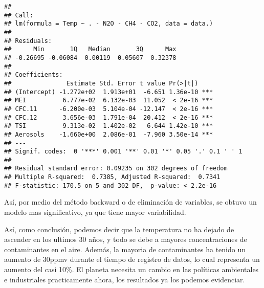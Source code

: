 \documentclass[]{article}
\begin{document}
\begin{verbatim}
## 
## Call:
## lm(formula = Temp ~ . - N2O - CH4 - CO2, data = data.)
## 
## Residuals:
##      Min       1Q   Median       3Q      Max 
## -0.26695 -0.06084  0.00119  0.05607  0.32378 
## 
## Coefficients:
##               Estimate Std. Error t value Pr(>|t|)    
## (Intercept) -1.272e+02  1.913e+01  -6.651 1.36e-10 ***
## MEI          6.777e-02  6.132e-03  11.052  < 2e-16 ***
## CFC.11      -6.200e-03  5.104e-04 -12.147  < 2e-16 ***
## CFC.12       3.656e-03  1.791e-04  20.412  < 2e-16 ***
## TSI          9.313e-02  1.402e-02   6.644 1.42e-10 ***
## Aerosols    -1.660e+00  2.086e-01  -7.960 3.50e-14 ***
## ---
## Signif. codes:  0 '***' 0.001 '**' 0.01 '*' 0.05 '.' 0.1 ' ' 1
## 
## Residual standard error: 0.09235 on 302 degrees of freedom
## Multiple R-squared:  0.7385, Adjusted R-squared:  0.7341 
## F-statistic: 170.5 on 5 and 302 DF,  p-value: < 2.2e-16
\end{verbatim}

Así, por medio del método backward o de eliminación de variables, se
obtuvo un modelo mas significativo, ya que tiene mayor variabilidad.

Así, como conclusión, podemos decir que la temperatura no ha dejado de
ascender en los ultimos 30 años, y todo se debe a mayores
concentraciones de contaminantes en el aire. Además, la mayoria de
contaminantes ha tenido un aumento de 30ppmv durante el tiempo de
registro de datos, lo cual representa un aumento del casi 10\%. El
planeta necesita un cambio en las políticas ambientales e industriales
practicamente ahora, los resultados ya los podemos evidenciar.
\end{document}
